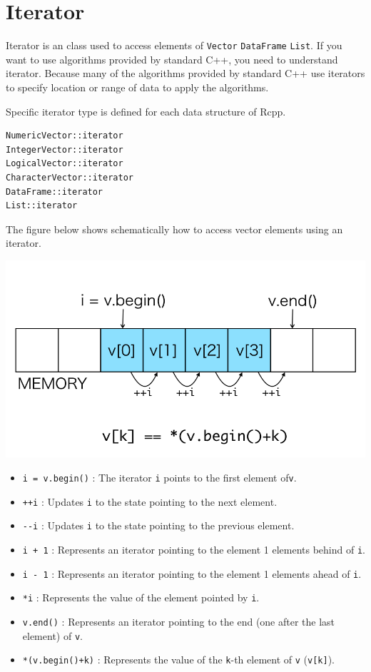 \documentclass[
]{book}
\providecommand{\tightlist}{%
  \setlength{\itemsep}{0pt}\setlength{\parskip}{0pt}}
\begin{document}
\hypertarget{iterator}{%
\chapter{Iterator}\label{iterator}}

Iterator is an class used to access elements of \texttt{Vector} \texttt{DataFrame} \texttt{List}. If you want to use algorithms provided by standard C++, you need to understand iterator. Because many of the algorithms provided by standard C++ use iterators to specify location or range of data to apply the algorithms.

Specific iterator type is defined for each data structure of Rcpp.

\begin{verbatim}
NumericVector::iterator
IntegerVector::iterator
LogicalVector::iterator
CharacterVector::iterator
DataFrame::iterator
List::iterator
\end{verbatim}

The figure below shows schematically how to access vector elements using an iterator.

\includegraphics{iterator.png}

\begin{itemize}
\tightlist
\item
  \texttt{i\ =\ v.begin()} : The iterator \texttt{i} points to the first element of\texttt{v}.
\item
  \texttt{++i} : Updates \texttt{i} to the state pointing to the next element.
\item
  \texttt{-\/-i} : Updates \texttt{i} to the state pointing to the previous element.
\item
  \texttt{i\ +\ 1} : Represents an iterator pointing to the element 1 elements behind of \texttt{i}.
\item
  \texttt{i\ -\ 1} : Represents an iterator pointing to the element 1 elements ahead of \texttt{i}.
\item
  \texttt{*i} : Represents the value of the element pointed by \texttt{i}.
\item
  \texttt{v.end()} : Represents an iterator pointing to the end (one after the last element) of \texttt{v}.
\item
  \texttt{*(v.begin()+k)} : Represents the value of the \texttt{k}-th element of \texttt{v} (\texttt{v{[}k{]}}).
\end{itemize}
\end{document}
